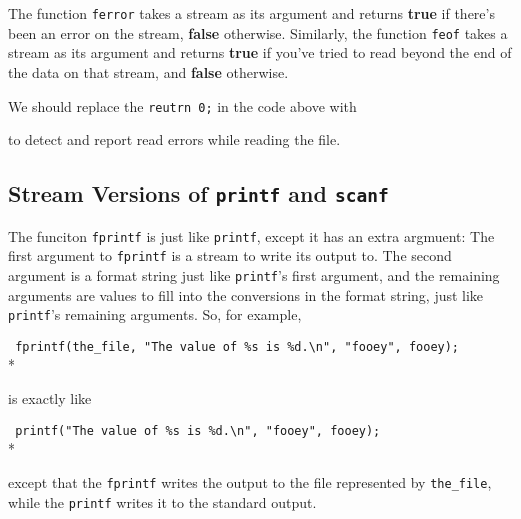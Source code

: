 The function {\tt ferror} takes a stream as its argument and returns
{\bf true} if there's been an error on the stream, {\bf false}
otherwise.  Similarly, the function {\tt feof} takes a stream as its
argument and returns {\bf true} if you've tried to read beyond the end
of the data on that stream, and {\bf false} otherwise.

We should replace the {\tt reutrn 0;} in the code above with


\noindent to detect and report read errors while reading the file.

\subsection{Stream Versions of {\tt printf} and {\tt scanf}}

The funciton {\tt fprintf} is just like {\tt printf}, except it has an
extra argmuent:  The first argument to {\tt fprintf} is a stream to
write its output to.  The second argument is a format string just like
{\tt printf}'s first argument, and the remaining arguments are values to
fill into the conversions in the format string, just like {\tt printf}'s
remaining arguments.  So, for example,

\begin{flushleft}
\verb! fprintf(the_file, "The value of %s is %d.\n", "fooey", fooey); ! \\*
\end{flushleft}

\noindent is exactly like 

\begin{flushleft}
\verb! printf("The value of %s is %d.\n", "fooey", fooey); ! \\*
\end{flushleft}

\noindent except that the {\tt fprintf} writes the output to the file
represented by {\tt the\_file}, while the {\tt printf} writes it to the
standard output.

